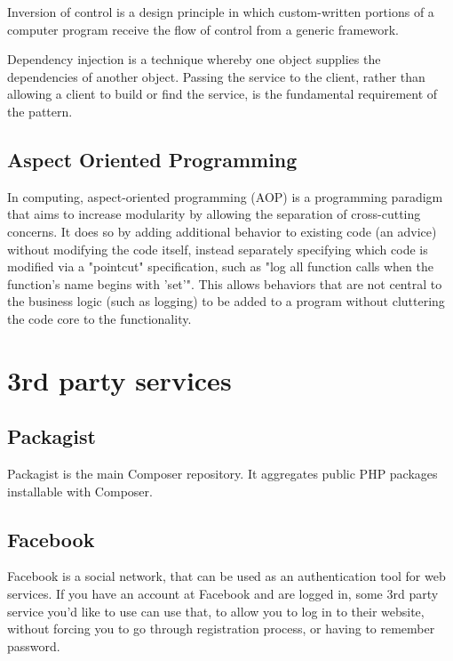 Inversion of control is a design principle in which custom-written portions of a computer program receive the flow of control from a generic framework.

Dependency injection is a technique whereby one object supplies the dependencies of another object. Passing the service to the client, rather than allowing a client to build or find the service, is the fundamental requirement of the pattern.~\cite{fowler:di}

\subsection{Aspect Oriented Programming} \label{sec:theory:aop}

In computing, aspect-oriented programming (AOP) is a programming paradigm that aims to increase modularity by allowing the separation of cross-cutting concerns. It does so by adding additional behavior to existing code (an advice) without modifying the code itself, instead separately specifying which code is modified via a "pointcut" specification, such as "log all function calls when the function's name begins with 'set'". This allows behaviors that are not central to the business logic (such as logging) to be added to a program without cluttering the code core to the functionality.~\cite{wiki:aop}

\section{3rd party services}

\subsection{Packagist} \label{sec:theory:packagist}

Packagist is the main Composer repository. It aggregates public PHP packages installable with Composer.~\cite{packagist:homepage}

\subsection{Facebook} \label{sec:theory:facebook}

Facebook is a social network, that can be used as an authentication tool for web services. If you have an account at Facebook and are logged in, some 3rd party service you'd like to use can use that, to allow you to log in to their website, without forcing you to go through registration process, or having to remember password.

